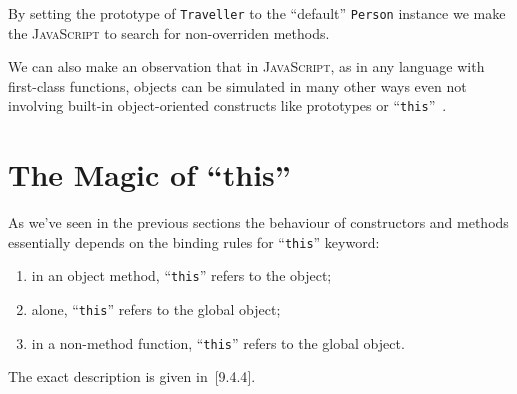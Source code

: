 \documentclass{article}
\newcommand{\js}{\textsc{JavaScript}\xspace}
\newcommand{\rf}[1]{[\textsc{#1}]}
\begin{document}
By setting the prototype of \lstinline|Traveller| to the ``default'' \lstinline|Person| instance we
make the \js to search for non-overriden methods.

We can also make an observation that in \js, as in any language with first-class functions,
objects can be simulated in many other ways even not involving built-in object-oriented
constructs like prototypes or ``\lstinline|this|''~\cite{Inheritance}.

\section{The Magic of ``\textrm{this}''}
\label{sec:this}

As we've seen in the previous sections the behaviour of constructors and methods essentially
depends on the binding rules for ``\lstinline|this|'' keyword:

\begin{enumerate}
\item in an object method, ``\lstinline|this|'' refers to the object;
\item alone, ``\lstinline|this|'' refers to the global object;
\item in a non-method function, ``\lstinline|this|'' refers to the global object.
\end{enumerate}

The exact description is given in~\rf{9.4.4}.



\end{document}
